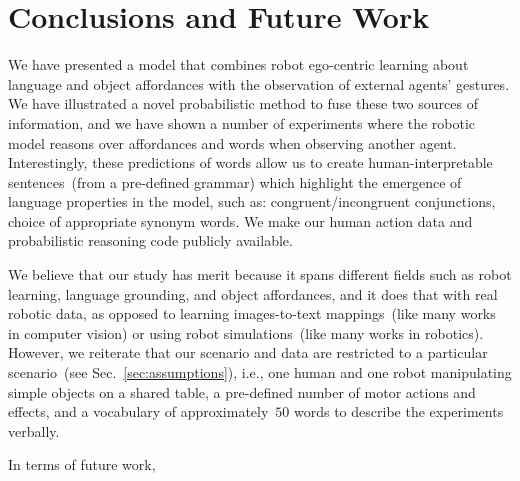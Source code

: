 
\section{Conclusions and Future Work}
\label{sec:conclusions}

We have presented a model that combines robot ego-centric learning about language and object affordances with the observation of external agents' gestures.
We have illustrated a novel probabilistic method to fuse these two sources of information, and we have shown a number of experiments where the robotic model reasons over affordances and words when observing another agent.
Interestingly, these predictions of words allow us to create human-interpretable sentences~(from a pre-defined grammar) which highlight the emergence of language properties in the model, such as:
congruent/incongruent conjunctions,
choice of appropriate synonym words. %
We make our human action data and probabilistic reasoning code publicly available.

We believe that our study has merit because it spans different fields such as robot learning, language grounding, and object affordances, and it does that with real robotic data, as opposed to learning images-to-text mappings~(like many works in computer vision) or using robot simulations~(like many works in robotics).
However, we reiterate that our scenario and data are restricted to a particular scenario~(see Sec.~\ref{sec:assumptions}), i.e., one human and one robot manipulating simple objects on a shared table, a pre-defined number of motor actions and effects, and a vocabulary of approximately~$50$ words to describe the experiments verbally.

In terms of future work,

